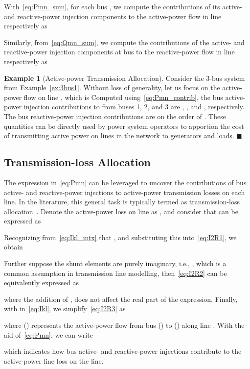 \documentclass[journal]{IEEEtran}
\theoremstyle{definition}
\newtheorem{example}{Example}
\newcommand{\qedblack}{\hfill \ensuremath{\blacksquare}}
\begin{document}
With~\eqref{eq:Pmn_sum}, for each bus , we compute the contributions of its active- and reactive-power injection components to the active-power flow in line  respectively as

Similarly, from~\eqref{eq:Qmn_sum}, we compute the contributions of the active- and reactive-power injection components at bus  to the reactive-power flow in line  respectively as


\begin{example}[Active-power Transmission Allocation]
\label{ex:3bus2}
Consider the 3-bus system from Example~\ref{ex:3bus1}. Without loss of generality, let us focus on the active-power flow on line , which is  Computed using~\eqref{eq:Pmn_contrib}, the bus active-power injection contributions to  from buses 1, 2, and 3 are , , and , respectively.  The bus reactive-power injection contributions are on the order of . These quantities can be directly used by power system operators to apportion the cost of transmitting active power on lines in the network to generators and loads.
\qedblack
\end{example}

\subsection{Transmission-loss Allocation}
\label{sec:loss}
The expression in~\eqref{eq:Pmn} can be leveraged to uncover the contributions of bus active- and reactive-power injections to active-power transmission losses on each line. In the literature, this general task is typically termed as transmission-loss allocation~\cite{Conejo-2001}. Denote the active-power loss on line  as , and consider that  can be expressed as 

Recognizing from~\eqref{eq:Ikl_mtx} that , and substituting this into~\eqref{eq:I2R1}, we obtain

Further suppose the shunt elements are purely imaginary, i.e., , which is a common assumption in transmission line modelling, then~\eqref{eq:I2R2} can be equivalently expressed as

where the addition of , does not affect the real part of the expression. Finally, with  in~\eqref{eq:Ikl}, we simplify~\eqref{eq:I2R3} as

where  () represents the active-power flow from bus  () to  () along line . With the aid of~\eqref{eq:Pmn}, we can write

which indicates how bus active- and reactive-power injections contribute to the active-power line loss on the  line.
\end{document}
